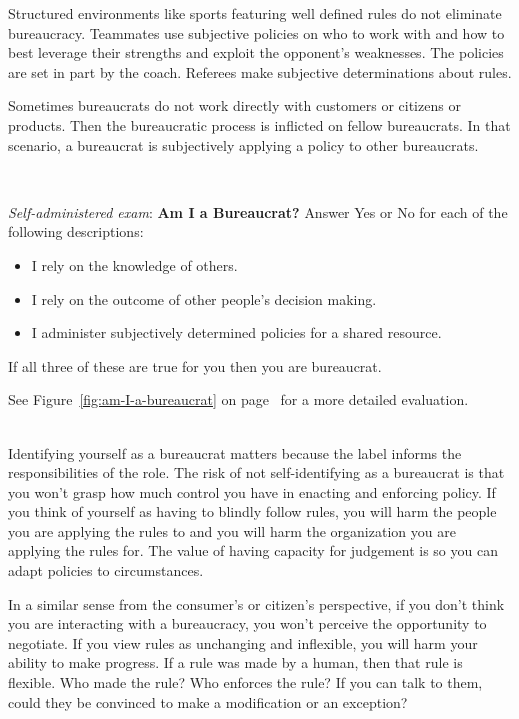 Structured environments like sports featuring well defined rules do not eliminate bureaucracy. Teammates use subjective policies on who to work with and how to best leverage their strengths and exploit the opponent's weaknesses. The policies are set in part by the coach. Referees make subjective determinations about rules.

Sometimes bureaucrats do not work directly with customers or citizens or products. Then the bureaucratic process is inflicted on fellow bureaucrats. In that scenario, a bureaucrat is subjectively applying a policy to other bureaucrats. 

\ \\


\begin{quizbox}{
      \textit{Self-administered exam}: 
      \textbf{Am I a Bureaucrat?}
}
Answer Yes or No for each of the following descriptions:
\begin{itemize}
    \item I rely on the knowledge of others. 
    \item I rely on the outcome of other people's decision making. 
    \item I administer subjectively determined policies for a shared resource. 
\end{itemize}
If all three of these are true for you then you are bureaucrat.
\end{quizbox} 
See Figure~\ref{fig:am-I-a-bureaucrat} on page~\pageref{fig:am-I-a-bureaucrat} for a more detailed evaluation.

\ \\

Identifying yourself as a bureaucrat matters because the label informs the responsibilities of the role. The risk of not self-identifying as a bureaucrat is that you won't grasp how much control you have in enacting and enforcing policy. If you think of yourself as having to blindly follow rules, you will harm the people you are applying the rules to and you will harm the organization you are applying the rules for. The value of having capacity for judgement is so you can adapt policies to circumstances. 

In a similar sense from the consumer's or citizen's perspective, if you don't think you are interacting with a bureaucracy, you won't perceive the opportunity to negotiate.  If you view rules as unchanging and inflexible, you will harm your ability to make progress. If a rule was made by a human, then that rule is flexible. Who made the rule? Who enforces the rule? If you can talk to them, could they be convinced to make a modification or an exception?

